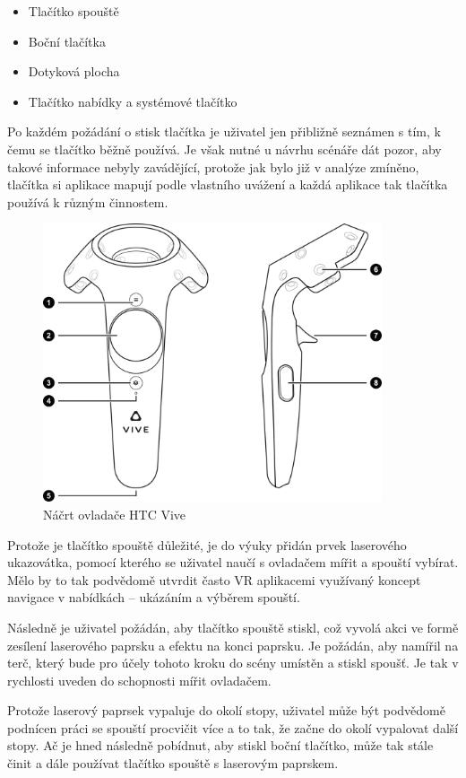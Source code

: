 \begin{itemize}
\tightlist
\item
  Tlačítko spouště
\item
  Boční tlačítka
\item
  Dotyková plocha
\item
  Tlačítko nabídky a systémové tlačítko
\end{itemize}

Po každém požádání o stisk tlačítka je uživatel jen přibližně seznámen s
tím, k čemu se tlačítko běžně používá. Je však nutné u návrhu scénáře
dát pozor, aby takové informace nebyly zavádějící, protože jak bylo již
v analýze zmíněno, tlačítka si aplikace mapují podle vlastního uvážení
a každá aplikace tak tlačítka používá k různým činnostem.

\begin{figure}[h!]
\centering
\includegraphics[width=10cm]{src/assets/vive-controller.png}
\caption{Náčrt ovladače HTC Vive\autocite{htcvivemanual}}
\end{figure}

Protože je tlačítko spouště důležité, je do výuky přidán prvek
laserového ukazovátka, pomocí kterého se uživatel naučí s ovladačem
mířit a spouští vybírat. Mělo by to tak podvědomě utvrdit často VR
aplikacemi využívaný koncept navigace v nabídkách -- ukázáním a výběrem
spouští.

Následně je uživatel požádán, aby tlačítko spouště stiskl, což vyvolá
akci ve formě zesílení laserového paprsku a efektu na konci paprsku.
Je požádán, aby namířil na terč, který bude pro účely tohoto
kroku do scény umístěn a stiskl spoušť. Je tak v rychlosti uveden do
schopnosti mířit ovladačem.

Protože laserový paprsek vypaluje do okolí stopy, uživatel může být
podvědomě podnícen práci se spouští procvičit více a to tak, že začne do
okolí vypalovat další stopy. Ač je hned následně pobídnut, aby stiskl
boční tlačítko, může tak stále činit a dále používat tlačítko spouště s
laserovým paprskem.

